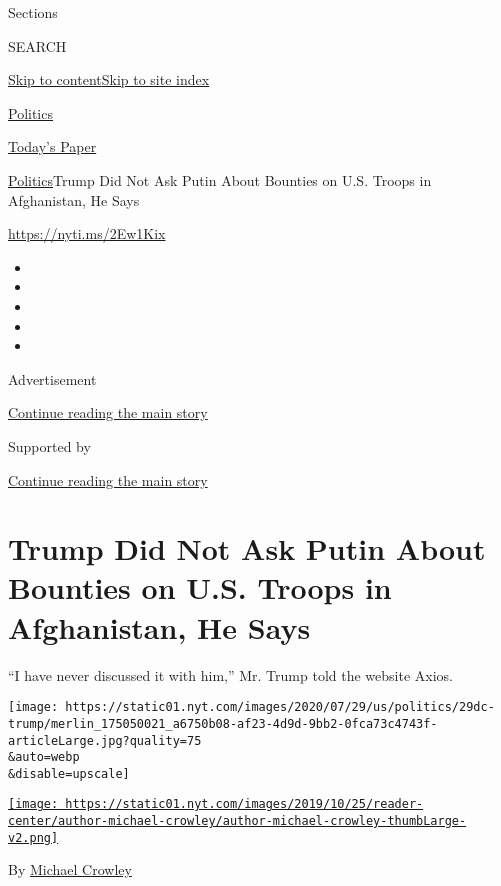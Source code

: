 Sections

SEARCH

\protect\hyperlink{site-content}{Skip to
content}\protect\hyperlink{site-index}{Skip to site index}

\href{https://www.nytimes.com/section/politics}{Politics}

\href{https://myaccount.nytimes.com/auth/login?response_type=cookie\&client_id=vi}{}

\href{https://www.nytimes.com/section/todayspaper}{Today's Paper}

\href{/section/politics}{Politics}\textbar{}Trump Did Not Ask Putin
About Bounties on U.S. Troops in Afghanistan, He Says

\url{https://nyti.ms/2Ew1Kix}

\begin{itemize}
\item
\item
\item
\item
\item
\end{itemize}

Advertisement

\protect\hyperlink{after-top}{Continue reading the main story}

Supported by

\protect\hyperlink{after-sponsor}{Continue reading the main story}

\hypertarget{trump-did-not-ask-putin-about-bounties-on-us-troops-in-afghanistan-he-says}{%
\section{Trump Did Not Ask Putin About Bounties on U.S. Troops in
Afghanistan, He
Says}\label{trump-did-not-ask-putin-about-bounties-on-us-troops-in-afghanistan-he-says}}

``I have never discussed it with him,'' Mr. Trump told the website
Axios.

\texttt{[image: https://static01.nyt.com/images/2020/07/29/us/politics/29dc-trump/merlin\_175050021\_a6750b08-af23-4d9d-9bb2-0fca73c4743f-articleLarge.jpg?quality=75\\\&auto=webp\\\&disable=upscale]}

\href{https://www.nytimes.com/by/michael-crowley}{\texttt{[image: https://static01.nyt.com/images/2019/10/25/reader-center/author-michael-crowley/author-michael-crowley-thumbLarge-v2.png]}}

By \href{https://www.nytimes.com/by/michael-crowley}{Michael Crowley}

